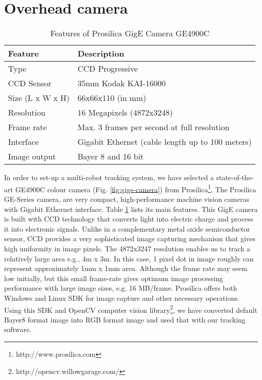 \section{Overhead camera}
\begin{table}
\caption{Features of Prosilica GigE Camera GE4900C}
\label{table:ge4900c}
\begin{center}
\begin{tabular}{|l||l|}
\hline \textbf{Feature} & \textbf{Description}\\
\hline Type & CCD Progressive\\
\hline CCD Sensor & 35mm Kodak KAI-16000\\
\hline Size (L x W x H) & 66x66x110 (in mm)\\
\hline Resolution & 16 Megapixels (4872x3248)\\ 
\hline Frame rate & Max. 3 frames per second at full resolution\\
\hline Interface & Gigabit Ethernet (cable length up to 100 meters)\\
\hline Image output & Bayer 8 and 16 bit\\
\hline
\end{tabular}
\end{center}
\end{table}
In order to set-up a multi-robot tracking system, we have selected a state-of-the-art GE4900C colour camera (Fig. \ref{fig:gige-camera}) from Prosilica\footnote{http://www.prosilica.com}. The Prosilica GE-Series camera, are very compact, high-performance machine vision cameras with Gigabit Ethernet interface.  Table \ref{table:ge4900c} lists its main features. This GigE camera is built with \acf{CCD} technology that converts light into electric charge and process it into electronic signals. Unlike in a complementary metal oxide semiconductor sensor, CCD provides a very sophisticated image capturing mechanism that gives high uniformity in image pixels. The 4872x3247 resolution enables us to track a relatively large area e.g., 4m x 3m. In this case, 1 pixel dot in image roughly can represent approximately 1mm x 1mm area. Although the frame rate may seem low initially, but this small frame-rate gives optimum image processing performance with large image sizes, e.g. 16 MB/frame. Prosilica offers both Windows and Linux \acf{SDK} for image capture and other necessary operations. Using this SDK and OpenCV computer vision library\footnote{http://opencv.willowgarage.com/}, we have converted default Bayer8 format image into RGB format image and used that with our tracking software.
